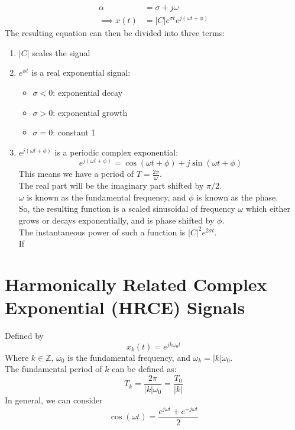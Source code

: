 \documentclass[nobib]{tufte-handout}
\begin{document}
\begin{enumerate}[start = 3]
\begin{align*}
              \alpha        & = \sigma + j\omega                      \\
              \implies x(t) & = |C|e^{\sigma t}e^{j(\omega t + \phi)}
          \end{align*}
          The resulting equation can then be divided into three terms:
          \begin{enumerate}
              \item $|C|$ scales the signal
              \item $e^{\phi t}$ is a real exponential signal:
                    \begin{itemize}
                        \item $\sigma < 0$: exponential decay
                        \item $\sigma > 0$: exponential growth
                        \item $\sigma = 0$: constant 1
                    \end{itemize}
              \item $e^{j(\omega t + \phi)}$ is a periodic complex exponential:
                    \begin{equation*}
                        e^{j(\omega t + \phi)} = \cos(\omega t +\phi)+j\sin(\omega t + \phi)
                    \end{equation*}
                    This means we have a period of $T = \frac{2\pi}{\omega}$.\\
                    The real part will be the imaginary part shifted by $\pi/2$.\\
                    $\omega$ is known as the fundamental frequency, and $\phi$ is known as the phase.\\
                    So, the resulting function is a scaled sinusoidal of frequency $\omega$ which either grows or decays exponentially, and is phase shifted by $\phi$.\\
                    The instantaneous power of such a function is $|C|^2e^{2\sigma t}$.\\
                    If
          \end{enumerate}
\end{enumerate}
\section{Harmonically Related Complex Exponential (HRCE) Signals}
Defined by
\begin{equation*}
    x_k(t) = e^{jk\omega_0 t}
\end{equation*}
Where $k \in \mathbb{Z}$, $\omega_0$ is the fundamental frequency, and $\omega_k=|k|\omega_0$.\\
The fundamental period of $k$ can be defined as:
\begin{equation*}
    T_k = \frac{2\pi}{|k|\omega_0} = \frac{T_0}{|k|}
\end{equation*}
In general, we can consider
\begin{equation*}
    \cos(\omega t) = \frac{e^{j\omega t}+e^{-j\omega t}}{2}
\end{equation*}
\end{document}
